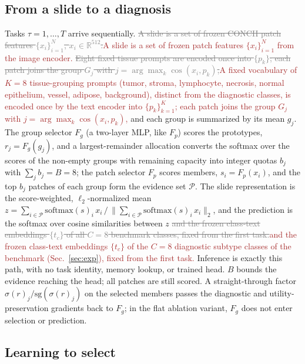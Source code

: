 \documentclass{article}
\newif\ifmarkup \markuptrue
\newcommand{\repc}[3]{\ifmarkup\textcolor{gray}{\sout{#2}}\textcolor{#1}{#3}\else#3\fi}
\newcommand{\repB}[2]{\repc{brown}{#1}{#2}}   %
\newcommand{\Fg}{F_g}
\newcommand{\Fp}{F_p}
\newcommand{\Psel}{\mathcal{P}}
\begin{document}
\subsection{From a slide to a diagnosis}
\label{ssec:setup}

Tasks $\tau=1,\ldots,T$ arrive sequentially. \repB{A slide is a set of frozen CONCH patch features $\{x_i\}_{i=1}^{N}$, $x_i\in\mathbb{R}^{512}$.}{A slide is a set of frozen patch features $\{x_i\}_{i=1}^{N}$ from the image encoder.} \repB{Eight fixed tissue prompts are encoded once into $\{p_k\}$; each patch joins the group $G_j$ with $j=\arg\max_k\cos(x_i,p_k)$,}{A fixed vocabulary of $K=8$ tissue-grouping prompts (tumor, stroma, lymphocyte, necrosis, normal epithelium, vessel, adipose, background), distinct from the diagnostic classes, is encoded once by the text encoder into $\{p_k\}_{k=1}^{K}$; each patch joins the group $G_j$ with $j=\arg\max_k\cos(x_i,p_k)$,} and each group is summarized by its mean $g_j$. The group selector $\Fg$ (a two-layer MLP, like $\Fp$) scores the prototypes, $r_j=\Fg(g_j)$, and a largest-remainder allocation converts the softmax over the scores of the non-empty groups with remaining capacity into integer quotas $b_j$ with $\sum_j b_j=B=8$; the patch selector $\Fp$ scores members, $s_i=\Fp(x_i)$, and the top $b_j$ patches of each group form the evidence set $\Psel$. The slide representation is the score-weighted, $\ell_2$-normalized mean $z=\sum_{i\in\Psel}\mathrm{softmax}(s)_i\,x_i\,/\,\bigl\|\sum_{i\in\Psel}\mathrm{softmax}(s)_i\,x_i\bigr\|_2$, and the prediction is the softmax over cosine similarities between $z$ \repB{and the frozen class-text embeddings $\{t_c\}$ of all $C=8$ benchmark classes, fixed from the first task.}{and the frozen class-text embeddings $\{t_c\}$ of the $C=8$ diagnostic subtype classes of the benchmark (Sec.~\ref{sec:exp}), fixed from the first task.} Inference is exactly this path, with no task identity, memory lookup, or trained head. $B$ bounds the evidence reaching the head; all patches are still scored. A straight-through factor $\sigma(r)_j/\mathrm{sg}(\sigma(r)_j)$ on the selected members passes the diagnostic and utility-preservation gradients back to $\Fg$; in the flat ablation variant, $\Fg$ does not enter selection or prediction.



\subsection{Learning to select}
\label{ssec:within}
\end{document}
